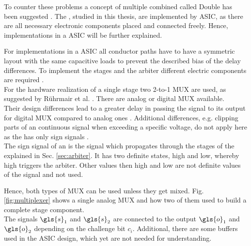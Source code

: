 To counter these problems a concept of multiple combined \apuf called Double \apuf has been suggested \cite{Machida2015ImplementationFPGA, Machida2015AFPGA}.
The \apufs, studied in this thesis, are implemented by \ac{ASIC}, as there are all necessary electronic components placed and connected freely.
Hence, \apuf implementations in a \ac{ASIC} will be further explained.

For \apuf implementations in a \ac{ASIC} all conductor paths have to have a symmetric layout with the same capacitive loads to prevent the described bias of the delay differences.
To implement the stages and the arbiter different electric components are required \cite{Maes2012ExperimentalCMOS}.\\
For the hardware realization of a single stage two 2-to-1 \ac{MUX} are used, as suggested by Rührmair et al. \cite{Ruhrmair2013PUFData, Lee2004AApplications}.
There are analog or digital \ac{MUX} available.\\
Their design differences lead to a greater delay in passing the signal to its output for digital \ac{MUX} compared to analog ones \cite{2016MultiplexerWikipedia}.
Additional differences, e.g. clipping parts of an continuous signal when exceeding a specific voltage, do not apply here as the \apuf has only sign signals \cite{Semiconductor2002BasicComparison}.\\
The sign signal of an \apuf is the signal which propagates through the stages of the \apuf explained in Sec. \ref{sec:arbiter}.
It has two definite states, high and low, whereby high triggers the arbiter.
Other values then high and low are not definite values of the signal and not used.

Hence, both types of \ac{MUX} can be used unless they get mixed.
Fig. \ref{fig:multiplexer} shows a single analog \ac{MUX} and how two of them used to build a complete stage component.\\
The signals $\gls{s}_1$ and $\gls{s}_2$ are connected to the output $\gls{o}_1$ and $\gls{o}_2$ depending on the challenge bit $c_i$.
Additional, there are some buffers used in the \ac{ASIC} design, which yet are not needed for understanding.

